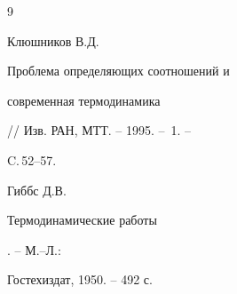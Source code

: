 \begin{thebibliography}{9}


Клюшников В.Д. {\em


Проблема определяющих соотношений и


современная термодинамика} // Изв. РАН, МТТ. -- 1995. -- \No\,1. --


C.\,52--57.







Гиббс Д.В. {\em


Термодинамические работы}. -- М.--Л.:


Гостехиздат, 1950. -- 492 с.





\end{thebibliography}





\vskip 2cm















